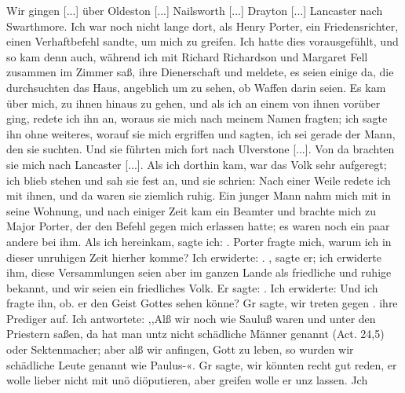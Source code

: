 Wir gingen [...] über Oldeston [...]
Nailsworth [...] Drayton [...]
Lancaster nach Swarthmore. 
Ich war noch nicht lange dort, als Henry 
Porter, ein Friedensrichter, einen Verhaftbefehl
sandte, um mich zu greifen. Ich hatte dies vorausgefühlt, und
so kam denn auch, während ich mit Richard 
Richardson und
Margaret Fell zusammen im Zimmer saß, 
ihre Dienerschaft und
meldete, es seien einige da, die durchsuchten das Haus, 
angeblich um zu sehen, ob Waffen darin seien. Es kam über mich, zu
ihnen hinaus zu gehen, und als ich an einem von ihnen vorüber
ging, redete ich ihn an, woraus sie mich nach meinem Namen
fragten; ich sagte ihn ohne weiteres, worauf sie mich ergriffen
und sagten, ich sei gerade der Mann, den sie suchten. Und sie
führten mich fort nach Ulverstone [...]. 
Von da brachten sie mich nach Lancaster [...].
Als ich dorthin kam, war das Volk
sehr aufgeregt; ich blieb stehen und sah sie fest an, und sie
schrien:  Nach einer Weile redete ich mit
ihnen, und da waren sie ziemlich ruhig. Ein junger Mann nahm
mich mit in seine Wohnung, und nach einiger Zeit kam ein 
Beamter und brachte mich zu Major Porter, 
der den Befehl gegen mich erlassen hatte; es waren noch ein 
paar andere bei ihm. Als
ich hereinkam, sagte ich: . Porter fragte
mich, warum ich in dieser unruhigen Zeit hierher komme? Ich
erwiderte: . , sagte er; ich erwiderte
ihm, diese Versammlungen seien aber im ganzen Lande als 
friedliche und ruhige bekannt, und wir seien ein friedliches Volk. Er
sagte: . Ich erwiderte: 
Und ich fragte ihn, ob.
er den Geist Gottes sehen könne? Gr sagte, wir treten gegen .
ihre Prediger auf. Ich antwortete: ,,Alß wir noch wie Sauluß waren
und unter den Priestern saßen, da hat man untz nicht schädliche
Männer genannt (Act. 24,5) oder Sektenmacher; aber alß wir
anfingen, Gott zu leben, so wurden wir schädliche Leute genannt
wie Paulus-«. Gr sagte, wir könnten recht gut reden, er wolle
lieber nicht mit unö diöputieren, aber greifen wolle er unz lassen. Jch
